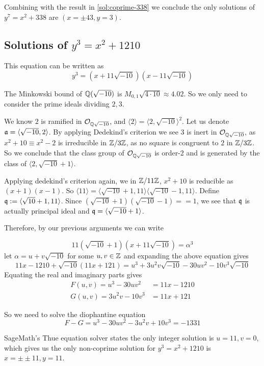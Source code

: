 Combining with the result in \autoref{sol:coprime-338} we conclude the only solutions of $y^7 = x^2 + 338$ are $(x=\pm 43, y =3)$.

\subsection{Solutions of \texorpdfstring{$y^3 = x^2 + 1210$}{}}

This equation can be written as 
$$
	y^3 = (x + 11 \sqrt{-10})(x - 11 \sqrt{-10})
$$

The Minkowski bound of $\mathbb{Q}(\sqrt{-10})$ is $M_{0, 1} \sqrt{4 \cdot 10} \approx 4.02$. 
So we only need to consider the prime ideals dividing $2, 3$.

We know $2$ is ramified in $\mathcal{O}_{\mathbb{Q}{\sqrt{-10}}}$, and $\langle 2\rangle = \langle 2, \sqrt{-10}\rangle^2$.
Let us denote $\mathfrak{a} = \langle \sqrt{-10}, 2\rangle$.
By applying Dedekind's criterion we see $3$ is inert in $\mathcal{O}_{\mathbb{Q}{\sqrt{-10}}}$, as $x^2  + 10 \equiv x^2 - 2$ is irreducible in $\mathbb{Z} / 3 \mathbb{Z}$, as no square is congruent to $2$ in $\mathbb{Z} / 3 \mathbb{Z}$.
So we conclude that the class group of $\mathcal{O}_{\mathbb{Q}{\sqrt{-10}}}$ is order-2 and is generated by the class of $\langle 2, \sqrt{-10}+1\rangle$.

Applying dedekind's criterion again, we in $\mathbb{Z}/11\mathbb{Z}$, $x^2 +  10$ is reducible as $(x+1)(x-1)$. 
So $\langle 11\rangle = \langle \sqrt{-10} + 1 , 11\rangle \langle \sqrt{-10} - 1, 11\rangle$. Define $\mathfrak{q} := \langle \sqrt{10} + 1, 11\rangle$.
Since $(\sqrt{-10} + 1)(\sqrt{-10} - 1) == 1$, we see that $\mathfrak{q}$ is actually principal ideal and $\mathfrak{q} = \langle \sqrt{-10} + 1\rangle$.

Therefore, by our previous arguments we can write 

$$
11(\sqrt{-10} + 1)(x + 11 \sqrt{-10}) = \alpha^3
$$
let $\alpha = u + v \sqrt{-10}$ for some $u, v \in \mathbb{Z}$ and expanding the above equation gives
$$11x - 1210 + \sqrt{-10} (11x + 121) = u^3 + 3 u^2 v \sqrt{-10} - 30 uv^2 - 10 v^3 \sqrt{-10}$$
Equating the real and imaginary parts gives
\begin{align*}
	F(u, v) = u^3 - 30 uv^2 & = 11x - 1210\\
	G(u, v) = 3 u^2 v - 10 v^3 & = 11x + 121
\end{align*}

So we need to solve the diophantine equation 
$$
F - G = u^3 - 30 uv^2 - 3 u^2 v + 10 v^3 = -1331
$$

SageMath's Thue equation solver states the only integer solution is $u = 11, v= 0$, 
which gives us the only non-coprime solution for $y^3 = x^2 + 1210$ is $x = \pm \pm 11, y = 11$.

